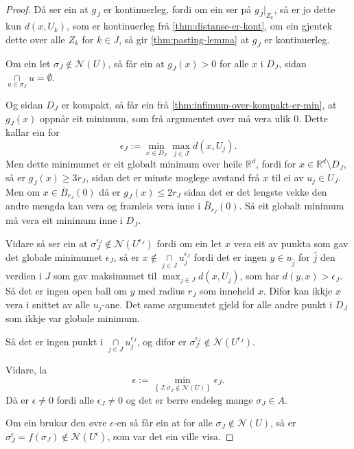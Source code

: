\documentclass[a4paper, 12pt, norsk]{article}
\theoremstyle{plain}
\theoremstyle{definition}
\newcommand{\Rb}{\mathbb{R}}
\newcommand{\Nc}{\mathcal{N}}
\newcommand{\intersect}{ \mathop{\cap}\limits }
\newcommand{\set}[1]{ \left\{ #1 \right\} } %
\begin{document}
\begin{proof}
	Då ser ein at \( g_J \) er kontinuerleg, fordi om ein ser på \( g_J|_{Z_k} \), så er jo dette kun \( d(x, U_k) \), som er kontinuerleg frå \autoref{thm:distanse-er-kont}, om ein gjentek dette over alle \( Z_k \) for \( k \in J \), så gir \autoref{thm:pasting-lemma} at \( g_J \) er kontinuerleg.

	Om ein let \( \sigma_J \not\in \Nc(U) \), så får ein at \( g_J(x) > 0 \) for alle \( x \) i \( D_J \), sidan \( \intersect_{u \in \sigma_J} u = \emptyset \).

	Og sidan \( D_J \) er kompakt, så får ein frå \autoref{thm:infimum-over-kompakt-er-min}, at \( g_J(x) \) oppnår eit minimum, som frå argumentet over må vera ulik \( 0 \). Dette kallar ein for
	\[
		\epsilon_J := \min_{x \in D_J} \max_{j \in J} d(x, U_j).
	\]
	Men dette minimumet er eit globalt minimum over heile \( \Rb^d \), fordi for \( x \in \Rb^d \setminus D_J \), så er \( g_J(x) \geq 3r_J \), sidan det er minste moglege avstand frå \( x \) til ei av \( u_j \in U_J \). Men om \( x \in \bar{B}_{r_J}(0) \) då er \( g_J(x) \leq 2r_J \) sidan det er det lengste vekke den andre mengda kan vera og framleis vera inne i \( \bar{B}_{r_J}(0) \). Så eit globalt minimum må vera eit minimum inne i \( D_J \).

	Vidare så ser ein at \( \sigma_J^{\epsilon_J} \not\in \Nc(U^{\epsilon_J}) \) fordi om ein let \( x \) vera eit av punkta som gav det globale minimumet \( \epsilon_J \), så er \( x \not\in \intersect_{j \in J} u_j^{\epsilon_J} \) fordi det er ingen \( y \in  u_{\hat{j}} \) for \( \hat{j} \) den verdien i \( J \) som gav maksimumet til \( \max_{j \in J} d(x, U_j) \), som har \( d(y, x) > \epsilon_J \). Så det er ingen open ball om \( y \) med radius \( r_J \) som inneheld \( x \). Difor kan ikkje \( x \) vera i snittet av alle \( u_j \)-ane. Det same argumentet gjeld for alle andre punkt i \( D_J \) som ikkje var globale minimum.
	
	Så det er ingen punkt i \( \intersect_{j \in J} u_j^{\epsilon_J} \), og difor er \( \sigma_J^{\epsilon_J} \not\in \Nc(U^{\epsilon_J}) \).

	Vidare, la
	\[
		\epsilon := \min_{\set{J : \sigma_J \not\in \Nc(U)}} \epsilon_J.
	\]
	Då er \( \epsilon \neq 0 \) fordi alle \( \epsilon_J \neq 0 \) og det er berre endeleg mange \( \sigma_J \in A \).

	Om ein brukar den øvre \( \epsilon \)-en så får ein at for alle \( \sigma_J \not\in \Nc(U) \), så er \( \sigma_J^{\epsilon}=f(\sigma_J) \not\in \Nc(U^{\epsilon}) \), som var det ein ville visa.
\end{proof}
\end{document}
